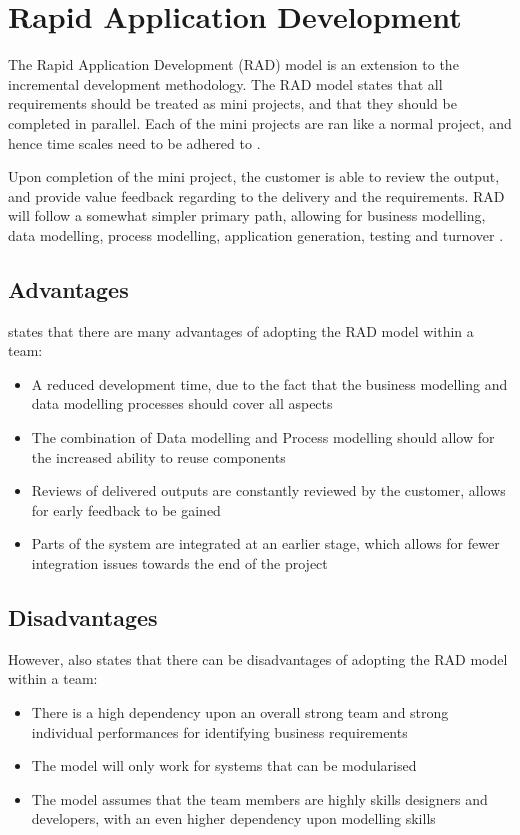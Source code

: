 \section{Rapid Application Development}
The Rapid Application Development (RAD) model is an extension to the 
incremental development methodology. The RAD model states that all requirements
should be treated as mini projects, and that they should be completed in 
parallel. Each of the mini projects are ran like a normal project, and hence 
time scales need to be adhered to \citep{istqb10}.

Upon completion of the mini project, the customer is able to review the output,
and provide value feedback regarding to the delivery and the requirements. RAD 
will follow a somewhat simpler primary path, allowing for business modelling, 
data modelling, process modelling, application generation, testing and turnover
\citep{istqb10}.


\subsection{Advantages}
\citet{istqb10} states that there are many advantages of adopting the RAD model
within a team:

\begin{itemize}
  \item A reduced development time, due to the fact that the business modelling
  and data modelling processes should cover all aspects
  \item The combination of Data modelling and Process modelling should allow 
  for the increased ability to reuse components
  \item Reviews of delivered outputs are constantly reviewed by the customer, 
  allows for early feedback to be gained
  \item Parts of the system are integrated at an earlier stage, which allows 
  for fewer integration issues towards the end of the project
\end{itemize}


\subsection{Disadvantages}
However, \citet{istqb10} also states that there can be disadvantages of 
adopting the RAD model within a team:

\begin{itemize}
  \item There is a high dependency upon an overall strong team and strong 
  individual performances for identifying business requirements
  \item The model will only work for systems that can be modularised
  \item The model assumes that the team members are highly skills designers and
  developers, with an even higher dependency upon modelling skills
\end{itemize}
